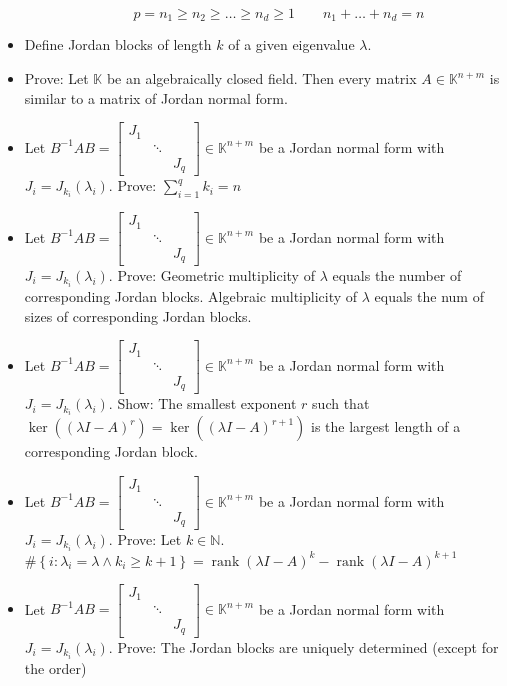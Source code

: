 \documentclass[a4paper]{article}
\newcommand{\set}[1]{\left\{#1\right\}}
\DeclareMathOperator{\rank}{rank}
\begin{document}
\begin{itemize}
\[      \qquad p = n_1 \geq n_2 \geq \dots \geq n_d \geq 1
      \qquad n_1 + \dots + n_d = n
    \]
  \item Define Jordan blocks of length $k$ of a given eigenvalue $\lambda$.
  \item Prove: Let $\mathbb K$ be an algebraically closed field. Then every matrix $A \in \mathbb K^{n+m}$ is similar to a matrix of Jordan normal form.
  \item Let $B^{-1} AB = \begin{bmatrix} J_1 & & \\ & \ddots & \\ & & J_q \end{bmatrix} \in \mathbb K^{n + m}$ be a Jordan normal form with $J_i = J_{k_i}(\lambda_i)$. Prove: $\sum_{i=1}^q k_i = n$
  \item Let $B^{-1} AB = \begin{bmatrix} J_1 & & \\ & \ddots & \\ & & J_q \end{bmatrix} \in \mathbb K^{n + m}$ be a Jordan normal form with $J_i = J_{k_i}(\lambda_i)$. Prove: Geometric multiplicity of $\lambda$ equals the number of corresponding Jordan blocks. Algebraic multiplicity of $\lambda$ equals the num of sizes of corresponding Jordan blocks.
  \item Let $B^{-1} AB = \begin{bmatrix} J_1 & & \\ & \ddots & \\ & & J_q \end{bmatrix} \in \mathbb K^{n + m}$ be a Jordan normal form with $J_i = J_{k_i}(\lambda_i)$. Show: The smallest exponent $r$ such that $\ker((\lambda I - A)^r) = \ker((\lambda I - A)^{r+1})$ is the largest length of a corresponding Jordan block.
  \item Let $B^{-1} AB = \begin{bmatrix} J_1 & & \\ & \ddots & \\ & & J_q \end{bmatrix} \in \mathbb K^{n + m}$ be a Jordan normal form with $J_i = J_{k_i}(\lambda_i)$. Prove: Let $k \in \mathbb N$. $\#\set{i: \lambda_i = \lambda \land k_i \geq k + 1} = \rank(\lambda I - A)^k - \rank(\lambda I - A)^{k+1}$
  \item Let $B^{-1} AB = \begin{bmatrix} J_1 & & \\ & \ddots & \\ & & J_q \end{bmatrix} \in \mathbb K^{n + m}$ be a Jordan normal form with $J_i = J_{k_i}(\lambda_i)$. Prove: The Jordan blocks are uniquely determined (except for the order)

\end{itemize}
\end{document}
